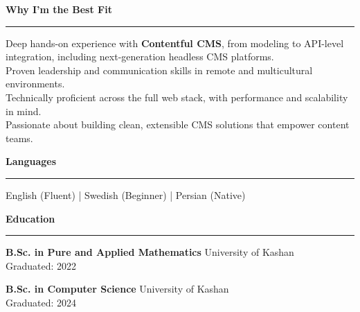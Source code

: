 \documentclass[a4paper,10pt]{article}
\newcommand{\sectiontitle}[1]{\vspace{6pt}\noindent\textbf{\large #1}\vspace{3pt}\hrule\vspace{6pt}}
\begin{document}
	\sectiontitle{Why I’m the Best Fit}
		Deep hands-on experience with \textbf{Contentful CMS}, from modeling to API-level integration, including next-generation headless CMS platforms.
		\\
		Proven leadership and communication skills in remote and multicultural environments.
		\\
		Technically proficient across the full web stack, with performance and scalability in mind.
		\\
		Passionate about building clean, extensible CMS solutions that empower content teams.
	
	\sectiontitle{Languages}
	English (Fluent) \quad | \quad Swedish (Beginner) \quad | \quad Persian (Native)
	
	\sectiontitle{Education}
	
	\textbf{B.Sc. in Pure and Applied Mathematics} \hfill University of Kashan \\
	Graduated: 2022
	
	\textbf{B.Sc. in Computer Science} \hfill University of Kashan \\
	Graduated: 2024
	
	
\end{document}
